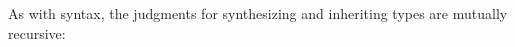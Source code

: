 \begin{fence}
\begin{code}
%
\>[4]%
\>[304I]\AgdaSpace{}%
\AgdaSpace{}%
\AgdaSpace{}%
\AgdaSpace{}%
\<%
\\
\>[.][@{}l@{}]\<[304I]%
\>[6]\AgdaComment{-----------------}\<%
\\
%
\>[4]\AgdaSpace{}%
\AgdaSpace{}%
\AgdaOperator{\AgdaInductiveConstructor{,}}\AgdaSpace{}%
\AgdaSpace{}%
\AgdaSpace{}%
\AgdaSpace{}%
\AgdaSpace{}%
\AgdaSpace{}%
\AgdaSpace{}%
\<%
\end{code}
\end{fence}

As with syntax, the judgments for synthesizing and inheriting types are
mutually recursive:

